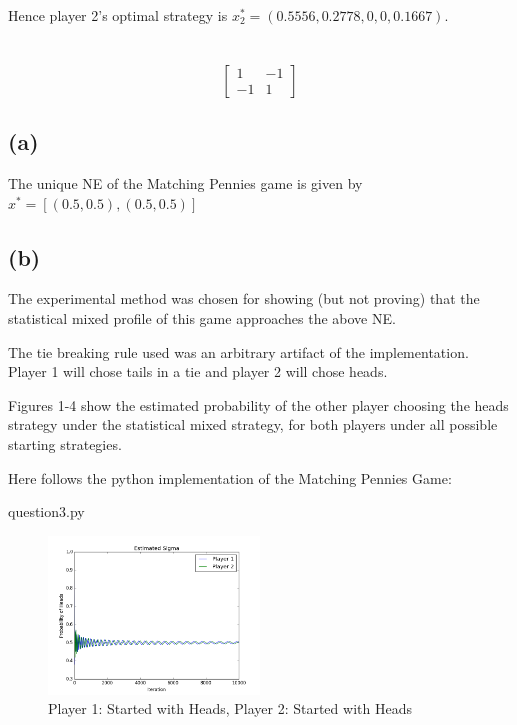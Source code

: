\documentclass[11pt]{article}
\begin{document}
Hence player 2's optimal strategy is $x^*_2 = (0.5556,0.2778,0,0,0.1667)$.

\section{}

\begin{equation}
  \begin{bmatrix}
    1 & -1 \\
    -1 & 1
  \end{bmatrix}
\end{equation}

\subsection*{(a)}

The unique NE of the Matching Pennies game is given by $x^* = [(0.5,0.5),(0.5,0.5)]$

\subsection*{(b)}

The experimental method was chosen for showing (but not proving) that the statistical mixed profile of this game approaches the above NE.

The tie breaking rule used was an arbitrary artifact of the implementation. Player 1 will chose tails in a tie and player 2 will chose heads.

Figures 1-4 show the estimated probability of the other player choosing the heads strategy under the statistical mixed strategy, for both players under all possible starting strategies.

Here follows the python implementation of the Matching Pennies Game:


{question3.py}

\begin{figure}[h]
  \caption{Player 1: Started with Heads, Player 2: Started with Heads}
  \centering
  \includegraphics[width=0.5\textwidth]{hh}
\end{figure}
\end{document}
